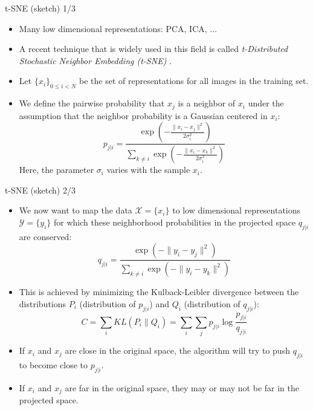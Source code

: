 \documentclass[xcolor=pdftex,dvipsnames,table]{beamer}
\begin{document}
\begin{frame}{t-SNE (sketch) 1/3}
\begin{itemize}
	\item Many low dimensional representations: PCA, ICA, $\ldots$
	\item A recent technique that is widely used in this field is called \emph{t-Distributed Stochastic Neighbor Embedding (t-SNE)} \cite{Maaten:2008}. 
	\item Let $\{x_i\}_{0\leq i < N}$ be the set of representations for all images in the training set. 
	\item We define the pairwise probability that $x_j$ is a neighbor of $x_i$ under the assumption that the neighbor probability is a Gaussian centered in $x_i$:  
	\begin{equation}
	p_{j|i} = \frac{\exp{\left(-\frac{\|x_i - x_j\|^2}{2 \sigma_i^2}\right)}}{\sum_{k\neq i} \exp{\left(-\frac{\|x_i - x_k\|^2}{2 \sigma_i^2}\right)} }
	\end{equation}
	Here, the parameter $\sigma_i$ varies with the sample $x_i$. 
\end{itemize}
\end{frame}


\begin{frame}{t-SNE (sketch) 2/3}
\begin{itemize}

	\item We now want to map the data $\mathcal{X} = \{x_i\}$ to low dimensional representations $\mathcal{Y} = \{y_i\}$ for which these neighborhood probabilities in the projected space $q_{j|i}$ are conserved: 
	\begin{equation}
	q_{j|i} = \frac{\exp{\left(-\|y_i - y_j\|^2\right)}}{\sum_{k\neq i} \exp{\left(-\|y_i - y_k\|^2\right)} }
	\end{equation}
	\item This is achieved by minimizing the Kulback-Leibler divergence between the distributions $P_i$ (distribution of $p_{j|i}$) and $Q_i$ (distribution of $q_{j|i}$): 
	\begin{equation}
		C = \sum_i KL(P_i\|Q_i) = \sum_i \sum_j p_{j|i}\log{\frac{p_{j|i}}{q_{j|i}}}
	\end{equation}
	\item If $x_i$ and $x_j$ are close in the original space, the algorithm will try to push $q_{j|i}$ to become close to $p_{j|i}$. 
	\item If $x_i$ and $x_j$ are far in the original space, they may or may not be far in the projected space. 
\end{itemize}
\end{frame}
\end{document}
